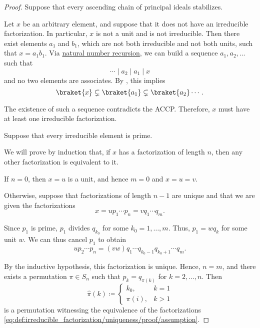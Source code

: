\begin{proof}
   Suppose that every ascending chain of principal ideals stabilizes.

  Let \( x \) be an arbitrary element, and suppose that it does not have an irreducible factorization. In particular, \( x \) is not a unit and is not irreducible. Then there exist elements \( a_1 \) and \( b_1 \), which are not both irreducible and not both units, such that \( x = a_1 b_1 \). Via \hyperref[rem:natural_number_recursion]{natural number recursion}, we can build a sequence \( a_1, a_2, \ldots \) such that
  \begin{equation*}
    \cdots \mid a_2 \mid a_1 \mid x
  \end{equation*}
  and no two elements are associates. By , this implies
  \begin{equation*}
    \braket{ x } \subsetneq \braket{ a_1 } \subsetneq \braket{ a_2 } \cdots.
  \end{equation*}

  The existence of such a sequence contradicts the ACCP. Therefore, \( x \) must have at least one irreducible factorization.

   Suppose that every irreducible element is prime.

  We will prove by induction that, if \( x \) has a factorization of length \( n \), then any other factorization is equivalent to it.

  If \( n = 0 \), then \( x = u \) is a unit, and hence \( m = 0 \) and \( x = u = v \).

  Otherwise, suppose that factorizations of length \( n - 1 \) are unique and that we are given the factorizations
  \begin{equation}\label{eq:def:irreducible_factorization/uniqueness/proof/assumption}
    x = u p_1 \cdots p_n = v q_1 \cdots q_m.
  \end{equation}

  Since \( p_1 \) is prime, \( p_1 \) divides \( q_{k_0} \) for some \( k_0 = 1, \ldots, m \). Thus, \( p_1 = w q_k \) for some unit \( w \). We can thus cancel \( p_1 \) to obtain
  \begin{equation*}
    u p_2 \cdots p_n = (vw) q_1 \cdots q_{k_0-1} q_{k_0+1} \cdots q_m.
  \end{equation*}

  By the inductive hypothesis, this factorization is unique. Hence, \( n = m \), and there exists a permutation \( \pi \in S_n \) such that \( p_k = q_{\pi(k)} \) for \( k = 2, \ldots, n \). Then
  \begin{equation*}
    \widehat{\pi}(k) \coloneqq \begin{cases}
      k_0,    & k = 1 \\
      \pi(i), & k > 1
    \end{cases}
  \end{equation*}
  is a permutation witnessing the equivalence of the factorizations \eqref{eq:def:irreducible_factorization/uniqueness/proof/assumption}.


\end{proof}
